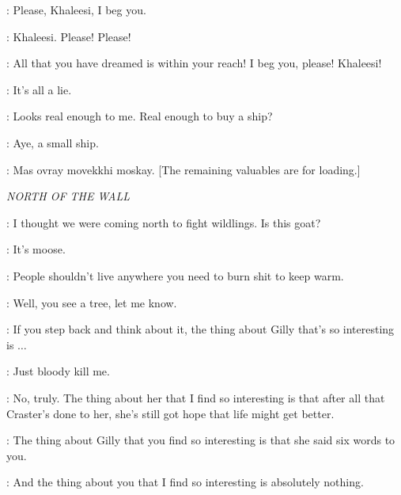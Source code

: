 \DOREAH:  Please, Khaleesi, I beg you. 


\DOREAH: Khaleesi. Please! Please! 

\XARO: All that you have dreamed is within your reach! I beg you, please!  Khaleesi! 


\JORAH: It's all a lie. 

\DAENERYS: Looks real enough to me.  Real enough to buy a ship? 

\JORAH: Aye, a small ship. 


\JORAH:  Mas ovray movekkhi moskay. [The remaining valuables are for loading.] 



\scene

\textit{NORTH OF THE WALL} 


\GRENN: I thought we were coming north to fight wildlings.  Is this goat? 

\EDD: It's moose.  

\GRENN: People shouldn't live anywhere you need to burn shit to keep warm. 

\EDD: Well, you see a tree, let me know. 

\SAM: If you step back and think about it, the thing about Gilly that's so interesting is $\ldots$  

\EDD:  Just bloody kill me. 

\SAM: No, truly. The thing about her that I find so interesting  is that after all that Craster's done to her, she's still got hope that life might get better. 

\EDD: The thing about Gilly that you find so interesting is that she said six words to you. 

\SAM:  And the thing about you that I find so interesting is absolutely nothing. 

